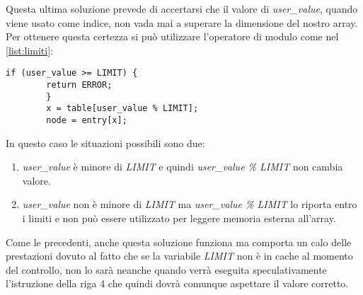 		Questa ultima soluzione prevede di accertarsi che il valore di \emph{user\_value}, quando viene usato come indice, non vada mai a superare la dimensione del nostro array. Per ottenere questa certezza si può utilizzare l'operatore di modulo come nel \cref{list:limiti}:
		
		\begin{lstlisting}[caption={Rispetto dei limiti forzato},label={list:limiti}]
		if (user_value >= LIMIT) {
		return ERROR;
		}
		x = table[user_value % LIMIT]; 
		node = entry[x];
		\end{lstlisting}
		
		In questo caso le situazioni possibili sono due:
		
		\begin{enumerate}
			\item \emph{user\_value} è minore di \emph{LIMIT} e quindi \emph{user\_value \% LIMIT} non cambia valore.
			\item \emph{user\_value} non è minore di \emph{LIMIT} ma \emph{user\_value \% LIMIT} lo riporta entro i limiti e non può essere utilizzato per leggere memoria esterna all'array.
		\end{enumerate}
	
		Come le precedenti, anche questa soluzione funziona ma comporta un calo delle prestazioni dovuto al fatto che se la variabile \emph{LIMIT} non è in cache al momento del controllo, non lo sarà neanche quando verrà eseguita speculativamente l'istruzione della riga 4 che quindi dovrà comunque aspettare il valore corretto. 